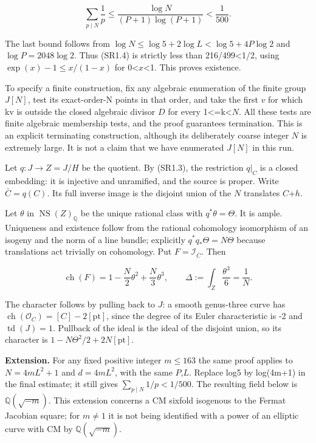\[
\sum_{p\mid N}\frac1p\leq\frac{\log N}{(P+1)\log(P+1)}<\frac1{500}.
\]

The last bound follows from \(\log N\leq\log5+2\log L<\log5+4P\log2\) and \(\log P=2048\log2\). Thus (SR1.4) is strictly less than 216/499\textless{}1/2, using \(\exp(x)-1\leq x/(1-x)\) for 0\textless{}\(x\)\textless{}1. This proves existence.

To specify a finite construction, fix any algebraic enumeration of the finite group \(J[N]\), test its exact-order-N points in that order, and take the first \(v\) for which kv is outside the closed algebraic divisor \(D\) for every 1\textless{}=k\textless{}\(N\). All these tests are finite algebraic membership tests, and the proof guarantees termination. This is an explicit terminating construction, although its deliberately coarse integer \(N\) is extremely large. It is not a claim that we have enumerated \(J[N]\) in this run.

Let \(q:J\to Z=J/H\) be the quotient. By (SR1.3), the restriction \(q|_C\) is a closed embedding: it is injective and unramified, and the source is proper. Write \(\bar C=q(C)\). Its full inverse image is the disjoint union of the \(N\) translates \(C\)+\(h\).

Let \(\theta\) in \(\operatorname{NS}(Z)_{\mathbb Q}\) be the unique rational class with \(q^*\theta=\Theta\). It is ample. Uniqueness and existence follow from the rational cohomology isomorphism of an isogeny and the norm of a line bundle; explicitly \(q^*q_*\Theta=N\Theta\) because translations act trivially on cohomology. Put \(F=\mathcal I_{\bar C}\). Then

\[
\operatorname{ch}(F)=1-\frac N2\theta^2+\frac N3\theta^3,\qquad\Delta:=\int_Z\frac{\theta^3}{6}=\frac1N.\tag{SR1.5}
\]

The character follows by pulling back to \(J\): a smooth genus-three curve has \(\operatorname{ch}(\mathcal O_C)=[C]-2[\mathrm{pt}]\), since the degree of its Euler characteristic is -2 and \(\operatorname{td}(J)=1\). Pullback of the ideal is the ideal of the disjoint union, so its character is \(1-N\Theta^2/2+2N[\mathrm{pt}]\).

\textbf{Extension.} For any fixed positive integer \(m\leq 163\) the same proof applies to \(N=4mL^2+1\) and \(d=4mL^2\), with the same \(P\),\(L\). Replace log5 by log(4m+1) in the final estimate; it still gives \(\sum_{p\mid N}1/p<1/500\). The resulting field below is \(\mathbb Q(\sqrt{-m})\). This extension concerns a CM sixfold isogenous to the Fermat Jacobian square; for \(m\ne 1\) it is not being identified with a power of an elliptic curve with CM by \(\mathbb Q(\sqrt{-m})\).

